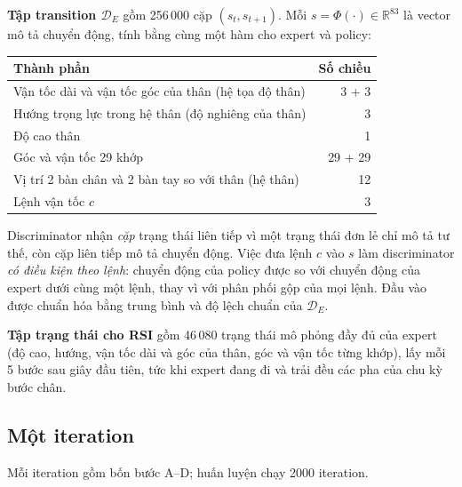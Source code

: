 \documentclass[11pt,a4paper]{article}
\newcommand{\R}{\mathbb{R}}
\begin{document}
\textbf{Tập transition $\mathcal{D}_E$} gồm 256\,000 cặp $(s_t, s_{t+1})$. Mỗi $s = \Phi(\cdot)
\in \R^{83}$ là vector mô tả chuyển động, tính bằng cùng một hàm cho expert và policy:
\begin{center}
\small
\begin{tabular}{@{}lr@{}}
\toprule
Thành phần & Số chiều \\
\midrule
Vận tốc dài và vận tốc góc của thân (hệ tọa độ thân) & 3 + 3 \\
Hướng trọng lực trong hệ thân (độ nghiêng của thân) & 3 \\
Độ cao thân & 1 \\
Góc và vận tốc 29 khớp & 29 + 29 \\
Vị trí 2 bàn chân và 2 bàn tay so với thân (hệ thân) & 12 \\
Lệnh vận tốc $c$ & 3 \\
\bottomrule
\end{tabular}
\end{center}
Discriminator nhận \emph{cặp} trạng thái liên tiếp vì một trạng thái đơn lẻ chỉ mô tả tư
thế, còn cặp liên tiếp mô tả chuyển động. Việc đưa lệnh $c$ vào $s$ làm discriminator
\emph{có điều kiện theo lệnh}: chuyển động của policy được so với chuyển động của expert
dưới cùng một lệnh, thay vì với phân phối gộp của mọi lệnh. Đầu vào được chuẩn hóa bằng
trung bình và độ lệch chuẩn của $\mathcal{D}_E$.

\textbf{Tập trạng thái cho RSI} gồm 46\,080 trạng thái mô phỏng đầy đủ của expert (độ cao,
hướng, vận tốc dài và góc của thân, góc và vận tốc từng khớp), lấy mỗi 5 bước sau giây
đầu tiên, tức khi expert đang đi và trải đều các pha của chu kỳ bước chân.

\subsection{Một iteration}
\label{sec:iter}
Mỗi iteration gồm bốn bước A--D; huấn luyện chạy 2000 iteration.
\end{document}
